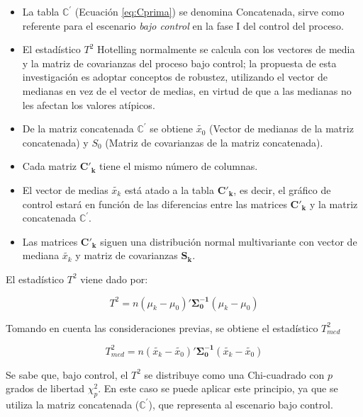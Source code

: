 \documentclass[mathematics,article,submit,moreauthors,pdftex]{mdpi}
\providecommand{\tightlist}{%
  \setlength{\itemsep}{0pt}\setlength{\parskip}{4pt}}
\begin{document}
\begin{itemize}
\tightlist
\item
  La tabla \(\mathbb{C}^{'}\) (Ecuación \ref{eq:Cprima}) se denomina
  Concatenada, sirve como referente para el escenario \emph{bajo
  control} en la fase I del control del proceso.
\item
  El estadístico \(T^2\) Hotelling normalmente se calcula con los
  vectores de media y la matriz de covarianzas del proceso bajo control;
  la propuesta de esta investigación es adoptar conceptos de robustez,
  utilizando el vector de medianas en vez de el vector de medias, en
  virtud de que a las medianas no les afectan los valores atípicos.
\item
  De la matriz concatenada \(\mathbb{C}^{'}\) se obtiene
  \(\tilde{x_{0}}\) (Vector de medianas de la matriz concatenada) y
  \(S_0\) (Matriz de covarianzas de la matriz concatenada).
\item
  Cada matriz \(\mathbf{C'_k}\) tiene el mismo número de columnas.
\item
  El vector de medias \(\tilde{x_{k}}\) está atado a la tabla
  \(\mathbf{C'_k}\), es decir, el gráfico de control estará en función
  de las diferencias entre las matrices \(\mathbf{C'_k}\) y la matriz
  concatenada \(\mathbf{\mathbb{C^{'}}}\).
\item
  Las matrices \(\mathbf{C'_k}\) siguen una distribución normal
  multivariante con vector de mediana \(\tilde{x_{k}}\) y matriz de
  covarianzas \(\mathbf{S_k}\).
\end{itemize}

El estadístico \(T^2\) viene dado por:

\begin{equation}
T^2=n (\mu_{k}-\mu_{0})'\mathbf{\Sigma_{0}^{-1}}(\mu_{k}-\mu_{0})
\label{eq:T2}
\end{equation}

Tomando en cuenta las consideraciones previas, se obtiene el estadístico
\(T^2_{med}\)

\begin{equation}
T^2_{med}=n (\tilde{x_{k}}-\tilde{x_{0}})'\mathbf{\Sigma_{0}^{-1}}(\tilde{x_{k}}-\tilde{x_{0}})
\label{eq:T2med}
\end{equation}

Se sabe que, bajo control, el \(T^2\) se distribuye como una
Chi-cuadrado con \(p\) grados de libertad \(\chi^2_p\). En este caso se
puede aplicar este principio, ya que se utiliza la matriz concatenada
(\(\mathbb{C}^{'}\)), que representa al escenario bajo control.
\end{document}

